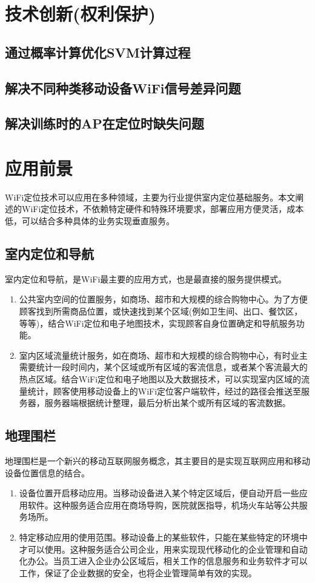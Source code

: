 \documentclass[UTF8, twocolumn ]{ctexart}
\begin{document}
\section{技术创新(权利保护)}
\subsection{通过概率计算优化SVM计算过程}
\subsection{解决不同种类移动设备WiFi信号差异问题}
\subsection{解决训练时的AP在定位时缺失问题}


\section{应用前景}
WiFi定位技术可以应用在多种领域，主要为行业提供室内定位基础服务。本文阐述的WiFi定位技术，不依赖特定硬件和特殊环境要求，部署应用方便灵活，成本低，可以结合多种具体的业务实现垂直服务。
\subsection{室内定位和导航}
室内定位和导航，是WiFi最主要的应用方式，也是最直接的服务提供模式。
\begin{enumerate}
\item 公共室内空间的位置服务，如商场、超市和大规模的综合购物中心。为了方便顾客找到所需商品位置，或快速找到某个区域(例如卫生间、出口、餐饮区，等等)，结合WiFi定位和电子地图技术，实现顾客自身位置确定和导航服务功能。
\item 室内区域流量统计服务，如在商场、超市和大规模的综合购物中心，有时业主需要统计一段时间内，某个区域或所有区域的客流信息，或者某个客流最大的热点区域。结合WiFi定位和电子地图以及大数据技术，可以实现室内区域的流量统计，顾客使用移动设备上的WiFi定位客户端软件，经过的路径会推送至服务器，服务器端根据统计整理，最后分析出某个或所有区域的客流数据。
\end{enumerate}
\subsection{地理围栏}
地理围栏是一个新兴的移动互联网服务概念，其主要目的是实现互联网应用和移动设备位置信息的结合。
\begin{enumerate}
\item 设备位置开启移动应用。当移动设备进入某个特定区域后，便自动开启一些应用软件。这种服务适合应用在商场导购，医院就医指导，机场火车站等公共服务场所。
\item 特定移动应用的使用范围。移动设备上的某些软件，只能在某些特定的环境中才可以使用。这种服务适合公司企业，用来实现现代移动化的企业管理和自动化办公。当员工进入企业办公区域后，相关工作的信息服务和业务软件才可以工作，保证了企业数据的安全，也将企业管理简单有效的实现。
\end{enumerate}
\end{document}
